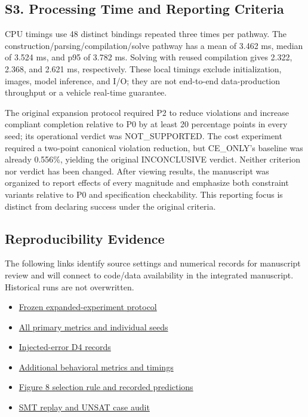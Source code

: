 \documentclass[11pt,a4paper]{article}
\begin{document}
\subsection*{S3. Processing Time and Reporting Criteria}

CPU timings use 48 distinct bindings repeated three times per pathway. The construction/parsing/compilation/solve pathway has a mean of 3.462 ms, median of 3.524 ms, and p95 of 3.782 ms. Solving with reused compilation gives 2.322, 2.368, and 2.621 ms, respectively. These local timings exclude initialization, images, model inference, and I/O; they are not end-to-end data-production throughput or a vehicle real-time guarantee.\par

The original expansion protocol required P2 to reduce violations and increase compliant completion relative to P0 by at least 20 percentage points in every seed; its operational verdict was NOT\_SUPPORTED. The cost experiment required a two-point canonical violation reduction, but CE\_ONLY's baseline was already 0.556\%, yielding the original INCONCLUSIVE verdict. Neither criterion nor verdict has been changed. After viewing results, the manuscript was organized to report effects of every magnitude and emphasize both constraint variants relative to P0 and specification checkability. This reporting focus is distinct from declaring success under the original criteria.\par

\begingroup\small\setlength{\parskip}{3pt}
\subsection*{Reproducibility Evidence}

The following links identify source settings and numerical records for manuscript review and will connect to code/data availability in the integrated manuscript. Historical runs are not overwritten.\par

\begin{itemize}\setlength{\itemsep}{0pt}\setlength{\parsep}{0pt}\setlength{\topsep}{2pt}
\item \href{\detokenize{../temporal-expansion-protocol-2026-09-29-001/protocol.json}}{Frozen expanded-experiment protocol}
\item \href{\detokenize{../temporal-experiment-closure-2026-09-29-001/all_primary_metrics.csv}}{All primary metrics and individual seeds}
\item \href{\detokenize{../../paper1-temporal-diversity-001/diversity-analysis-2026-09-29-001/RESULT.json}}{Injected-error D4 records}
\item \href{\detokenize{../temporal-secondary-metrics-2026-09-29-001/RESULT.json}}{Additional behavioral metrics and timings}
\item \href{\detokenize{selected_cases.json}}{Figure 8 selection rule and recorded predictions}
\end{itemize}

\begin{itemize}\setlength{\itemsep}{0pt}\setlength{\parsep}{0pt}\setlength{\topsep}{2pt}
\item \href{\detokenize{unsat_review.json}}{SMT replay and UNSAT case audit}
\end{itemize}
\endgroup
\end{document}

